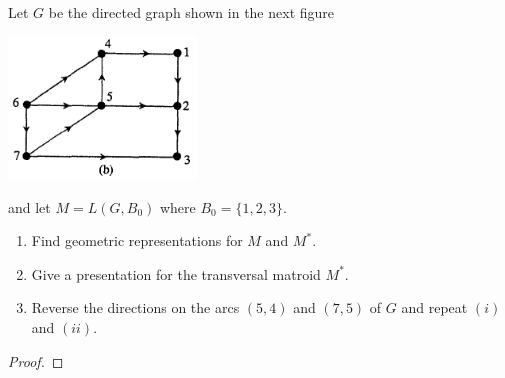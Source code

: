 \prob
{
    Let $G$ be the directed graph shown in the next figure 
		            \begin{center}
                \includegraphics[width=5cm]{Test2/Problem13/Figure2_17.png}
            \end{center}\pn
		and let $M = L(G, B_0)$ where $B_0 = \{1,2,3\}$. 
    \begin{enumerate}[label=(\roman*)]
        \item   Find geometric representations for $M$ and $M^*$.
        \item   Give a presentation for the transversal matroid $M^*$.
        \item   Reverse the directions on the arcs $(5,4)$ and $(7,5)$ of $G$
                and repeat $(i)$ and $(ii)$.
    \end{enumerate}
}
\begin{proof}
\end{proof}